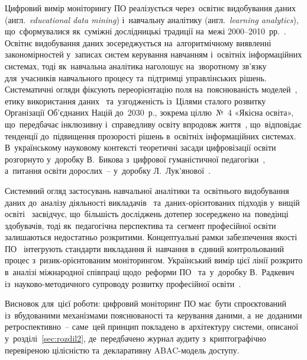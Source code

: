 Цифровий вимір моніторингу ПО реалізується через~освітнє видобування даних (англ.\ \textit{educational data mining}) і~навчальну аналітику (англ.\ \textit{learning analytics}), що~сформувалися як~суміжні дослідницькі традиції на~межі 2000--2010~рр.~\cite{Romero2020EDM}. Освітнє видобування даних зосереджується на~алгоритмічному виявленні закономірностей у~записах систем керування навчанням і~освітніх інформаційних системах, тоді як~навчальна аналітика наголошує на~зворотному зв'язку для~учасників навчального процесу та~підтримці управлінських рішень. Систематичні огляди фіксують переорієнтацію поля на~пояснюваність моделей~\cite{Gunasekara2025XAI}, етику використання даних~\cite{Sharma2025EthicalLA} та~узгодженість із~Цілями сталого розвитку Організації Об'єднаних Націй до~2030~р., зокрема ціллю~№~4 «Якісна освіта», що~передбачає інклюзивну і~справедливу освіту впродовж життя~\cite{Nuankaew2025AISDG4}, що~відповідає тенденції до~підвищення прозорості рішень в~освітніх інформаційних системах. В~українському науковому контексті теоретичні засади цифровізації освіти розгорнуто у~доробку В.~Бикова з~цифрової гуманістичної педагогіки~\cite{Bykov2016DigitalHumanistic}, а~питання освіти дорослих~-- у~доробку Л.~Лук'янової~\cite{Lukianova2020Adult}.

Системний огляд застосувань навчальної аналітики та~освітнього видобування даних до~аналізу діяльності викладачів~\cite{Chen2024TeachersLA} та~даних-орієнтованих підходів у~вищій освіті~\cite{GonzalezPerez2025} засвідчує, що~більшість досліджень дотепер зосереджено на~поведінці здобувачів, тоді як~педагогічна перспектива та~сегмент професійної освіти залишаються недостатньо розкритими. Концептуальні рамки забезпечення якості ПО~\cite{Wafudu2024QAVET, Yang2025VETQA} інтегрують стандарти викладання й~навчання в~єдиний контрольований процес з~ризик-орієнтованим моніторингом. Український вимір цієї лінії розкрито в~аналізі міжнародної співпраці щодо~реформи ПО~\cite{Soloviov2025UkraineVET} та~у~доробку В.~Радкевич із~науково-методичного супроводу розвитку професійної освіти~\cite{Radkevych2023Monograph}.

Висновок для~цієї роботи: цифровий моніторинг ПО має~бути спроєктований із~вбудованими механізмами пояснюваності та~керування даними, а~не~доданими ретроспективно~-- саме~цей принцип покладено в~архітектуру системи, описаної у~розділі~\ref{sec:rozdil2}, де~передбачено журнал аудиту з~криптографічно перевіреною цілісністю та~декларативну ABAC-модель доступу.

